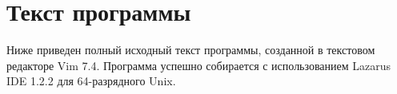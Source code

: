 \section{Текст программы}
Ниже приведен полный исходный текст программы, созданной в текстовом 
редакторе Vim 7.4. Программа успешно собирается с использованием Lazarus IDE
1.2.2
для 64-разрядного Unix.\\
\\
\\
\\

\\

\pagebreak
